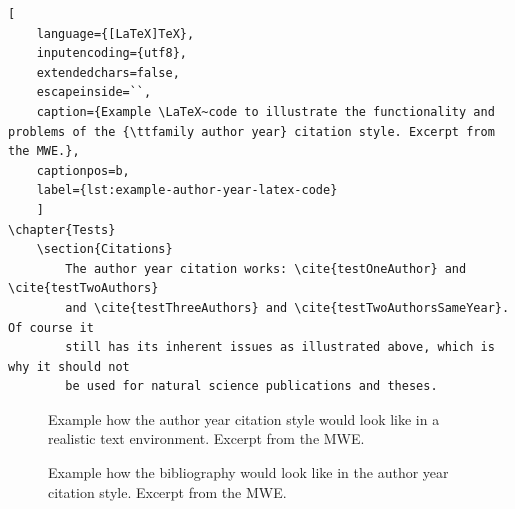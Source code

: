 \begin{lstlisting}[
	language={[LaTeX]TeX},
	inputencoding={utf8}, 
	extendedchars=false,  
	escapeinside=``,
	caption={Example \LaTeX~code to illustrate the functionality and problems of the {\ttfamily author year} citation style. Excerpt from the MWE.},
	captionpos=b,
	label={lst:example-author-year-latex-code}
	]
\chapter{Tests}
    \section{Citations}
        The author year citation works: \cite{testOneAuthor} and \cite{testTwoAuthors}
        and \cite{testThreeAuthors} and \cite{testTwoAuthorsSameYear}. Of course it 
        still has its inherent issues as illustrated above, which is why it should not
        be used for natural science publications and theses.
\end{lstlisting}
		
			\begin{figure}[h!]
				\centering
				\caption{Example how the {\ttfamily author year} citation style would look like in a realistic text environment. Excerpt from the MWE.}
				\label{fig:example-typeset-output-author-year-text}
			\end{figure}
			
			\newpage
			\begin{figure}[h!]
				\centering
				\caption{Example how the bibliography would look like in the {\ttfamily author year} citation style. Excerpt from the MWE.}
				\label{fig:example-typeset-output-author-year-bib}
			\end{figure}
			
